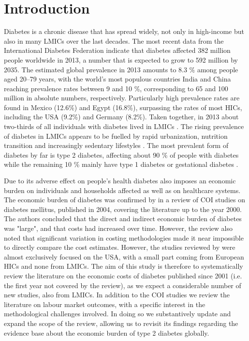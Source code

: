 \section{Introduction}
Diabetes is a chronic disease that has spread widely, not only in high-income but also in many \acp{LMIC} over the last decades. The most recent data from the International Diabetes Federation indicate that diabetes affected 382 million people worldwide in 2013, a number that is expected to grow to 592 million by 2035. The estimated global prevalence in 2013 amounts to 8.3 \% among people aged 20--79 years, with the world's most populous countries India and China reaching prevalence rates between 9 and 10 \%, corresponding to 65 and 100 million in absolute numbers, respectively. Particularly high prevalence rates are found in Mexico (12.6\%) and Egypt (16.8\%), surpassing the rates of most \acp{HIC}, including the USA (9.2\%) and Germany (8.2\%).\parencite{InternationalDiabetesFederation2013} Taken together, in 2013 about two-thirds of all individuals with diabetes lived in \acp{LMIC} \parencite{InternationalDiabetesFederation2013}. The rising prevalence of diabetes in \acp{LMIC} appears to be fuelled by rapid urbanization, nutrition transition and increasingly sedentary lifestyles \parencite{Hu2011}. The most prevalent form of diabetes by far is type 2 diabetes, affecting about 90 \% of people with diabetes while the remaining 10 \% mainly have type 1 diabetes or gestational diabetes \parencite{InternationalDiabetesFederation2013}.

Due to its adverse effect on people's health diabetes also imposes an economic burden on individuals and households affected as well as on healthcare systems. The economic burden of diabetes was confirmed by   in a review of \ac{COI} studies on diabetes mellitus, published in 2004, covering the literature up to the year 2000. The authors concluded that the direct and indirect economic burden of diabetes was "large", and that costs had increased over time. However, the review also noted that significant variation in costing methodologies made it near impossible to directly compare the cost estimates. However, the studies reviewed by \textcite{Ettaro2004} were almost exclusively focused on the USA, with a small part coming from European \acp{HIC} and none from \acp{LMIC}. The aim of this study is therefore to systematically review the literature on the economic costs of diabetes published since 2001 (i.e. the first year not covered by the \textcite{Ettaro2004} review), as we expect a considerable number of new studies, also from \acp{LMIC}. In addition to the \ac{COI} studies we review the literature on labour market outcomes, with a specific interest in the methodological challenges involved. In doing so we substantively update and expand the scope of the \textcite{Ettaro2004} review, allowing us to revisit its findings regarding the evidence base about the economic burden of type 2 diabetes globally.

